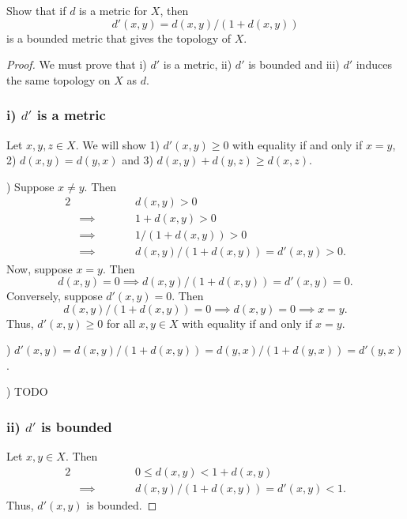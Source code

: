 %
\begin{exercise}[ID=2.20.11]
  Show that if $d$ is a metric for $X$, then
  \begin{equation*}
    d'(x, y) = d(x, y) / (1 + d(x, y))
  \end{equation*}
  is a bounded metric that gives the topology of $X$.
\end{exercise}
%
\begin{solution}
  \begin{proof}
    We must prove that i) $d'$ is a metric, ii) $d'$ is bounded and iii) $d'$ induces the same topology on $X$ as $d$.
    \subsubsection*{i) $d'$ is a metric}
    Let $x, y, z \in X$.
    We will show 1) $d'(x, y) \geq 0$ with equality if and only if $x = y$, 2) $d(x, y) = d(y, x)$ and 3) $d(x, y) + d(y, z) \geq d(x, z)$.
    \bigskip

    ) Suppose $x \neq y$.
    Then
    \begin{alignat*}{2}
      &           && \qquad d(x, y) > 0 \\
      & \implies  && \qquad 1 + d(x, y) > 0 \\
      & \implies  && \qquad 1 / (1 + d(x, y)) > 0 \\
      & \implies  && \qquad d(x, y) / (1 + d(x, y)) = d'(x, y) > 0.
    \end{alignat*}
    Now, suppose $x = y$.
    Then
    \begin{equation*}
      d(x, y) = 0 \implies d(x, y) / (1 + d(x, y)) = d'(x, y) = 0.
    \end{equation*}
    Conversely, suppose $d'(x, y) = 0$.
    Then
    \begin{equation*}
      d(x, y) / (1 + d(x, y)) = 0 \implies d(x, y) = 0 \implies x = y.
    \end{equation*}
    Thus, $d'(x, y) \geq 0$ for all $x, y \in X$ with equality if and only if $x = y$.
    \bigskip

    ) $d'(x, y) = d(x, y) / (1 + d(x, y)) = d(y, x) / (1 + d(y, x)) = d'(y, x)$.
    \bigskip

    ) TODO


    \subsubsection*{ii) $d'$ is bounded}
    Let $x, y \in X$.
    Then
    \begin{alignat*}{2}
      &           && \qquad 0 \leq d(x, y) < 1 + d(x, y) \\
      & \implies  && \qquad d(x, y) / (1 + d(x, y)) = d'(x, y) < 1.
    \end{alignat*}
    Thus, $d'(x, y)$ is bounded.


\end{proof}
\end{solution}
